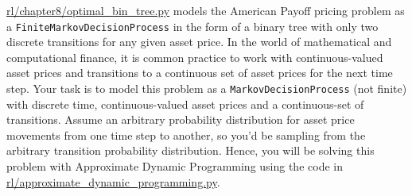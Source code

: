 \documentclass[12pt]{exam}
\begin{document}
\begin{questions}
\question \href{https://github.com/TikhonJelvis/RL-book/blob/master/rl/chapter8/optimal_exercise_bin_tree.py}{rl\//chapter8\//optimal\_bin\_tree.py} models the American Payoff pricing problem as a \lstinline{FiniteMarkovDecisionProcess} in the form of a binary tree with only two discrete transitions for any given asset price. In the world of mathematical and computational finance, it is common practice to work with continuous-valued asset prices and transitions to a continuous set of asset prices for the next time step. Your task is to model this problem as a \lstinline{MarkovDecisionProcess} (not finite) with discrete time, continuous-valued asset prices and a continuous-set of transitions. Assume an arbitrary probability distribution for asset price movements from one time step to another, so you'd be sampling from the arbitrary transition probability distribution. Hence, you will be solving this problem with Approximate Dynamic Programming using the code in \href{https://github.com/TikhonJelvis/RL-book/blob/master/rl/approximate_dynamic_programming.py}{rl\//approximate\_dynamic\_programming.py}.

\end{questions}
\end{document}
